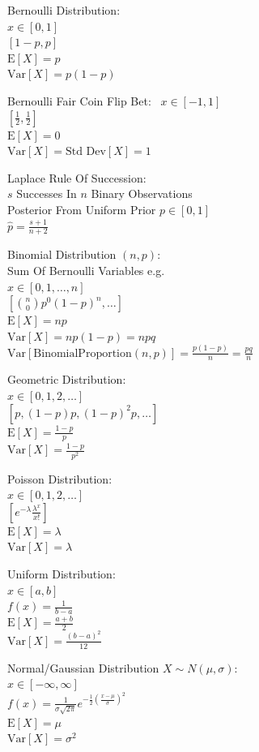 Bernoulli Distribution: \\
$x \in [0,1]$ \\
$[1-p,p]$ \\
$\text{E}[X]=p$ \\
$\text{Var}[X]=p(1-p)$

Bernoulli Fair Coin Flip Bet: \
$x \in [-1,1]$ \\
$\left[\frac{1}{2},\frac{1}{2}\right]$ \\
$\text{E}[X]=0$ \\
$\text{Var}[X]=\text{Std Dev}[X]=1$

Laplace Rule Of Succession: \\
$s$ Successes In $n$ Binary Observations \\
Posterior From Uniform Prior $p \in [0,1]$ \\
$\hat{p}=\frac{s+1}{n+2}$

Binomial Distribution $(n,p)$: \\
Sum Of Bernoulli Variables e.g. \\
$x \in [0,1,\dots,n]$ \\
$[\binom{n}{0}p^0(1-p)^n,\dots]$ \\
$\text{E}[X]=np$ \\
$\text{Var}[X]=np(1-p)=npq$ \\
$\text{Var}[\text{BinomialProportion}(n,p)]=\frac{p(1-p)}{n}=\frac{pq}{n}$

Geometric Distribution: \\
$x \in [0,1,2,\dots]$ \\
$[p,(1-p)p,(1-p)^2p,\dots]$ \\
$\text{E}[X]=\frac{1-p}{p}$ \\
$\text{Var}[X]=\frac{1-p}{p^2}$

Poisson Distribution: \\
$x \in [0,1,2,\dots]$ \\
$[e^{-\lambda}\frac{\lambda^x}{x!}]$ \\
$\text{E}[X]=\lambda$ \\
$\text{Var}[X]=\lambda$

Uniform Distribution: \\
$x \in [a,b]$ \\
$f(x) = \frac{1}{b-a}$ \\
$\text{E}[X] = \frac{a+b}{2}$ \\
$\text{Var}[X] = \frac{(b-a)^2}{12}$

Normal/Gaussian Distribution $X \sim N(\mu,\sigma)$: \\
$x \in [-\infty,\infty]$ \\
$f(x) = \frac{1}{\sigma\sqrt{2\pi}}e^{-\frac{1}{2} \left( \frac{x-\mu}{\sigma} \right)^2}$ \\
$\text{E}[X]=\mu$ \\
$\text{Var}[X]=\sigma^2$

